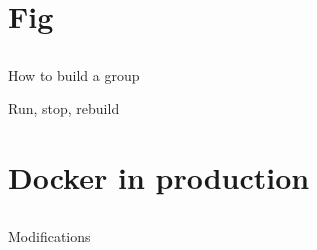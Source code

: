 \documentclass{beamer}
\begin{document}
    \section{Fig}
    \subsection{}
    \begin{frame}{How to build a group}
    \end{frame}
    \begin{frame}{Run, stop, rebuild}
    \end{frame}
    \section{Docker in production}
    \subsection{}
    \begin{frame}{Modifications}
    \end{frame}
\end{document}
